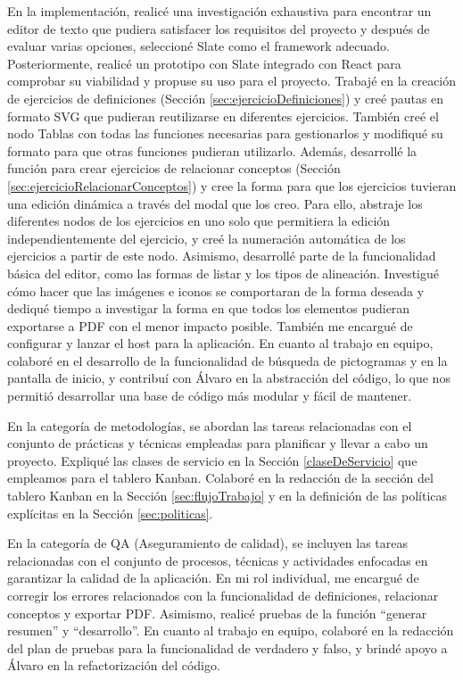 En la implementación, realicé una investigación exhaustiva para encontrar un editor de texto que pudiera satisfacer los requisitos del proyecto y después de evaluar varias opciones, seleccioné Slate como el framework adecuado. Posteriormente, realicé un prototipo con Slate integrado con React para comprobar su viabilidad y propuse su uso para el proyecto. Trabajé en la creación de ejercicios de definiciones (Sección \ref{sec:ejercicioDefiniciones}) y creé pautas en formato SVG que pudieran reutilizarse en diferentes ejercicios. También creé el nodo Tablas con todas las funciones necesarias para gestionarlos y modifiqué su formato para que otras funciones pudieran utilizarlo. Además, desarrollé la función para crear ejercicios de relacionar conceptos (Sección \ref{sec:ejercicioRelacionarConceptos}) y cree la forma para que los ejercicios tuvieran una edición dinámica a través del modal que los creo. Para ello, abstraje los diferentes nodos de los ejercicios en uno solo que permitiera la edición independientemente del ejercicio, y creé la numeración automática de los ejercicios a partir de este nodo. Asimismo, desarrollé parte de la funcionalidad básica del editor, como las formas de listar y los tipos de alineación. Investigué cómo hacer que las imágenes e iconos se comportaran de la forma deseada y dediqué tiempo a investigar la forma en que todos los elementos pudieran exportarse a PDF con el menor impacto posible. También me encargué de configurar y lanzar el host para la aplicación. En cuanto al trabajo en equipo, colaboré en el desarrollo de la funcionalidad de búsqueda de pictogramas y en la pantalla de inicio, y contribuí con Álvaro en la abstracción del código, lo que nos permitió desarrollar una base de código más modular y fácil de mantener.

En la categoría de metodologías, se abordan las tareas relacionadas con el conjunto de prácticas y técnicas empleadas para planificar y llevar a cabo un proyecto. Expliqué las clases de servicio en la Sección \ref{claseDeServicio} que empleamos para el tablero Kanban. Colaboré en la redacción de la sección del tablero Kanban en la Sección \ref{sec:flujoTrabajo} y en la definición de las políticas explícitas en la Sección \ref{sec:politicas}.

En la categoría de QA (Aseguramiento de calidad), se incluyen las tareas relacionadas con el conjunto de procesos, técnicas y actividades enfocadas en garantizar la calidad de la aplicación. En mi rol individual, me encargué de corregir los errores relacionados con la funcionalidad de definiciones, relacionar conceptos y exportar PDF. Asimismo, realicé pruebas de la función ``generar resumen'' y ``desarrollo''. En cuanto al trabajo en equipo, colaboré en la redacción del plan de pruebas para la funcionalidad de verdadero y falso, y brindé apoyo a Álvaro en la refactorización del código.


